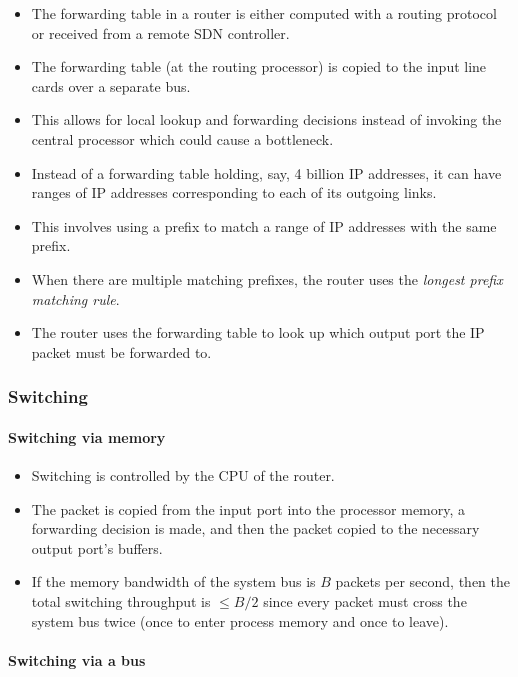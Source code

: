 \documentclass{article}
\begin{document}
\begin{itemize}
    \item The forwarding table in a router is either computed with a routing protocol or received from a remote SDN controller.
    \item The forwarding table (at the routing processor) is copied to the input line cards over a separate bus.
    \item This allows for local lookup and forwarding decisions instead of invoking the central processor which could cause a bottleneck.
    \item Instead of a forwarding table holding, say, 4 billion IP addresses, it can have ranges of IP addresses corresponding to each of its outgoing links.
    \item This involves using a prefix to match a range of IP addresses with the same prefix.
    \item When there are multiple matching prefixes, the router uses the \emph{longest prefix matching rule}.
    \item The router uses the forwarding table to look up which output port the IP packet must be forwarded to.
\end{itemize} 

\subsubsection{Switching}

\paragraph{Switching via memory}

\begin{itemize}
    \item Switching is controlled by the CPU of the router.
    \item The packet is copied from the input port into the processor memory, a forwarding decision is made, and then the packet copied to the necessary output port's buffers.
    \item If the memory bandwidth of the system bus is $B$ packets per second, then the total switching throughput is $\leq B/2$ since every packet must cross the system bus twice (once to enter process memory and once to leave).
\end{itemize}

\paragraph{Switching via a bus}
\end{document}

